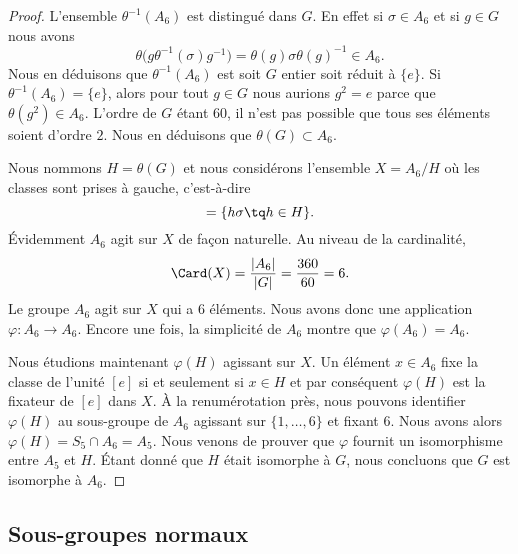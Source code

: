 \begin{proof}
    L'ensemble \( \theta^{-1}(A_6)\) est distingué dans \( G\). En effet si \( \sigma\in A_6\) et si \( g\in G\) nous avons
    \begin{equation}
        \theta\big( g\theta^{-1}(\sigma)g^{-1} \big)=\theta(g)\sigma \theta(g)^{-1}\in A_6.
    \end{equation}
    Nous en déduisons que \( \theta^{-1}(A_6)\) est soit \( G\) entier soit réduit à \( \{ e \}\). Si \( \theta^{-1}(A_6)=\{ e \}\), alors pour tout \( g\in G\) nous aurions \( g^2=e\) parce que \( \theta(g^2)\in A_6\). L'ordre de \( G\) étant \( 60\), il n'est pas possible que tous ses éléments soient d'ordre \( 2\). Nous en déduisons que \( \theta(G)\subset A_6\).

    Nous nommons \( H=\theta(G)\) et nous considérons l'ensemble \( X=A_6/H\) où les classes sont prises à gauche, c'est-à-dire
    \begin{equation}
        [\sigma]=\{ h\sigma\tq h\in H \}.
    \end{equation}
    Évidemment \( A_6\) agit sur \( X\) de façon naturelle. Au niveau de la cardinalité,
    \begin{equation}
        \Card(X)=\frac{ | A_6 | }{ | G | }=\frac{ 360 }{ 60 }=6.
    \end{equation}
    Le groupe \( A_6\) agit sur \( X\) qui a \( 6\) éléments. Nous avons donc une application \( \varphi\colon A_6\to A_6\). Encore une fois, la simplicité de \( A_6\) montre que \( \varphi(A_6)=A_6\).

    Nous étudions maintenant \( \varphi(H)\) agissant sur \( X\). Un élément \( x\in A_6\) fixe la classe de l'unité \( [e]\) si et seulement si \( x\in H\) et par conséquent \( \varphi(H)\) est la fixateur de \( [e]\) dans \( X\). À la renumérotation près, nous pouvons identifier \( \varphi(H)\) au sous-groupe de \( A_6\) agissant sur \( \{ 1,\ldots, 6 \}\) et fixant \( 6\). Nous avons alors \( \varphi(H)=S_5\cap A_6=A_5\). Nous venons de prouver que \( \varphi\) fournit un isomorphisme entre \( A_5\) et \( H\). Étant donné que \( H\) était isomorphe à \( G\), nous concluons que \( G\) est isomorphe à \( A_6\).
\end{proof}

\subsection{Sous-groupes normaux}

